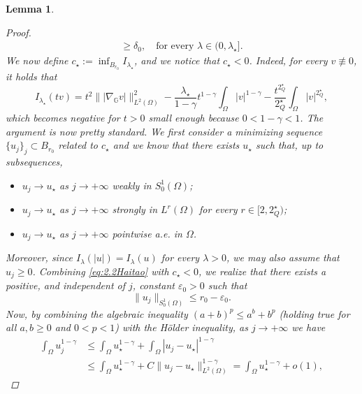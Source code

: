 \documentclass[11pt]{amsart}
\numberwithin{equation}{section} %
\newtheorem{lemma}[teo]{Lemma}
\theoremstyle{definition}
\begin{document}
\begin{lemma}
\begin{proof}
\begin{equation}
\begin{split}
				\geq \delta_0, \quad \textrm{for every } \lambda \in (0,\lambda_{\star}].
			\end{split}
		\end{equation}
		We now define $c_{\star}:= \inf_{B_{r_0}}I_{\lambda_{\star}}$, and we notice that $c_{\star}<0$. Indeed, for every $v\not\equiv 0$, it holds that
		\begin{equation*}
			I_{\lambda_{\star}}(tv) = t^2 \||\nabla_{\mathbb{G}}v|\|_{L^{2}(\Omega)}^2 - \dfrac{\lambda_{\star}}{1-\gamma}t^{1-\gamma}\int_{\Omega}|v|^{1-\gamma}  - \dfrac{t^{2^{\star}_{Q}}}{2^{\star}_{Q}}\int_{\Omega}|v|^{2^{\star}_{Q}},
		\end{equation*}
		\noindent which becomes negative for $t>0$ small enough because $0<1-\gamma<1$. The argument is now pretty standard. We first consider a minimizing sequence $\{u_j\}_j
		\subset B_{r_0}$ related to $c_{\star}$ and we know that there exists $u_{\star}$ such that, up to subsequences,
		\begin{itemize}
			\item $u_j \to u_{\star}$ as $j \to +\infty$ weakly in $S^{1}_{0}(\Omega)$;
			\item $u_j \to u_{\star}$ as $j \to +\infty$ strongly in $L^{r}(\Omega)$ for every $r \in [2,2^{\star}_{Q})$;
			\item $u_j \to u_{\star}$ as $j \to +\infty$ pointwise a.e. in $\Omega$.
		\end{itemize}
		Moreover, since $I_{\lambda}(|u|) = I_{\lambda}(u)$ for every $\lambda>0$, we may also assume that $u_j \geq 0$.
		Combining \eqref{eq:2.2Haitao} with $c_{\star}<0$, we realize that there exists a positive, and independent of $j$, constant $\varepsilon_0>0$  such that
		\begin{equation} \label{eq:boundrhoujtodeduce}
			\|u_j\|_{S^{1}_{0}(\Omega)} \leq r_0 - \varepsilon_0.
		\end{equation}
		Now, by combining the
		algebraic inequality $(a+b)^p\leq a^b+b^p$ (holding true for
		all $a,b\geq 0$ and $0<p<1$) with the
		H\"{o}lder inequality, as $j\to +\infty$ we have
		\begin{equation*}
			\begin{split}
				\int_{\Omega}u_j^{1-\gamma} & \leq \int_{\Omega}u_{\star}^{1-\gamma}+
				\int_{\Omega}|u_j - u_{\star}|^{1-\gamma}  
				\\
				& \leq \int_{\Omega}u_{\star}^{1-\gamma}+ 
				C \|u_j-u_{\star}\|^{1-\gamma}_{L^{2}(\Omega)} = \int_{\Omega}u_{\star}^{1-\gamma} + o(1),
			\end{split}

\end{equation*}
\end{proof}
\end{lemma}
\end{document}
